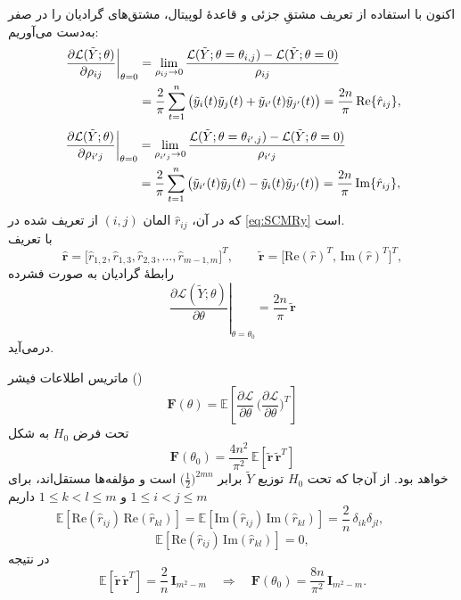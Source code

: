 \begin{اثبات}
	اکنون با استفاده از تعریف مشتقِ جزئی و قاعدهٔ لوپیتال، مشتق‌های گرادیان را در صفر به‌دست می‌آوریم:
	\begin{align}
	\left.\frac{\partial \mathcal{L}(\tilde Y;\theta)}{\partial \rho_{ij}}\right|_{\theta=0}
	&=\lim_{\rho_{ij}\to 0}\frac{\mathcal{L}(\tilde Y;\theta=\theta_{i,j})-\mathcal{L}(\tilde Y;\theta=0)}{\rho_{ij}} \notag \\
	&=\frac{2}{\pi}\sum_{t=1}^{n}\big(\tilde y_i(t)\tilde y_j(t)+\tilde y_{i'}(t)\tilde y_{j'}(t)\big)
	=\frac{2n}{\pi}\,\mathrm{Re}\{\hat r_{ij}\}, \label{eq:74}
	\end{align}
	\begin{align}
	\left.\frac{\partial \mathcal{L}(\tilde Y;\theta)}{\partial \rho_{i'j}}\right|_{\theta=0}
	&=\lim_{\rho_{i'j}\to 0}\frac{\mathcal{L}(\tilde Y;\theta=\theta_{i',j})-\mathcal{L}(\tilde Y;\theta=0)}{\rho_{i'j}} \notag \\
	&=\frac{2}{\pi}\sum_{t=1}^{n}\big(\tilde y_{i'}(t)\tilde y_{j}(t)-\tilde y_{i}(t)\tilde y_{j'}(t)\big)
	=\frac{2n}{\pi}\,\mathrm{Im}\{\hat r_{ij}\}, \label{eq:75}
	\end{align}
	که در آن،
	$
	\hat r_{ij}
	$
	المان 
	$(i, j)$
	از  تعریف شده در \eqref{eq:SCMRy} است.\\
	با تعریف
	\[
	\hat{\mathbf{r}}=\big[\hat r_{1,2},\hat r_{1,3},\hat r_{2,3},\ldots,\hat r_{m-1,m}\big]^{T},\qquad
	\tilde{\mathbf{r}}=\big[\mathrm{Re}(\hat r)^{T},\,\mathrm{Im}(\hat r)^{T}\big]^{T},
	\]
	رابطهٔ گرادیان به صورت فشرده
	\begin{equation}
	\left.\frac{\partial \mathcal{L}(\tilde Y;\theta)}{\partial \theta}\right|_{\theta=\theta_0}
	=\frac{2n}{\pi}\,\tilde{\mathbf{r}}
	\end{equation}
	درمی‌آید.
	
	ماتریس اطلاعات فیشر ()
	\[
	\mathbf{F}(\theta)=\mathbb{E}\!\left[\frac{\partial \mathcal{L}}{\partial \theta}\,
	\Big(\frac{\partial \mathcal{L}}{\partial \theta}\Big)^{\!T}\right]
	\]
	تحت فرض \(H_0\) به شکل
	\begin{equation}
	\mathbf{F}(\theta_0)=\frac{4n^{2}}{\pi^{2}}\,
	\mathbb{E}\!\left[\tilde{\mathbf{r}}\,\tilde{\mathbf{r}}^{T}\right]
	\end{equation}
	خواهد بود. از آن‌جا که تحت \(H_0\) توزیع \(\tilde Y\) برابر \(\big(\tfrac{1}{2}\big)^{2mn}\) است
	و مؤلفه‌ها مستقل‌اند، برای \(1\le i<j\le m\) و \(1\le k<l\le m\) داریم
	\begin{equation}
	\mathbb{E}\!\left[\mathrm{Re}(\hat r_{ij})\,\mathrm{Re}(\hat r_{kl})\right]
	=\mathbb{E}\!\left[\mathrm{Im}(\hat r_{ij})\,\mathrm{Im}(\hat r_{kl})\right]
	=\frac{2}{n}\,\delta_{ik}\delta_{jl},\qquad
	\end{equation}
	\begin{equation}
	\mathbb{E}\!\left[\mathrm{Re}(\hat r_{ij})\,\mathrm{Im}(\hat r_{kl})\right]=0,
	\end{equation}
	در نتیجه
	\begin{equation}
	\mathbb{E}\!\left[\tilde{\mathbf{r}}\,\tilde{\mathbf{r}}^{T}\right]=\frac{2}{n}\,\mathbf{I}_{m^{2}-m}
	\quad\Longrightarrow\quad
	\mathbf{F}(\theta_0)=\frac{8n}{\pi^{2}}\,\mathbf{I}_{m^{2}-m}.
	\end{equation}
	

\end{اثبات}
